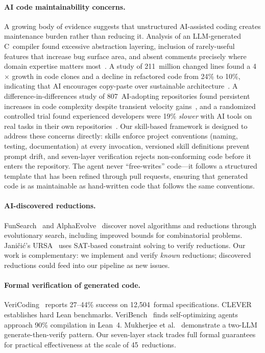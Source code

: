 \documentclass[conference]{IEEEtran}
\begin{document}
\paragraph{AI code maintainability concerns.}
A growing body of evidence suggests that unstructured AI-assisted coding creates maintenance burden rather than reducing it.
Analysis of an LLM-generated C~compiler found excessive abstraction layering, inclusion of rarely-useful features that increase bug surface area, and absent comments precisely where domain expertise matters most~\cite{Jones2026LLMCompiler}.
A study of 211~million changed lines found a 4$\times$ growth in code clones and a decline in refactored code from 24\% to 10\%, indicating that AI encourages copy-paste over sustainable architecture~\cite{GitClear2025CodeQuality}.
A difference-in-differences study of 807~AI-adopting repositories found persistent increases in code complexity despite transient velocity gains~\cite{CursorAI2025SpeedCost}, and a randomized controlled trial found experienced developers were 19\% \emph{slower} with AI tools on real tasks in their own repositories~\cite{Becker2025METRProductivity}.
Our skill-based framework is designed to address these concerns directly: skills enforce project conventions (naming, testing, documentation) at every invocation, versioned skill definitions prevent prompt drift, and seven-layer verification rejects non-conforming code before it enters the repository.
The agent never ``free-writes'' code---it follows a structured template that has been refined through pull requests, ensuring that generated code is as maintainable as hand-written code that follows the same conventions.

\paragraph{AI-discovered reductions.}
FunSearch~\cite{RomeraParedes2023FunSearch} and AlphaEvolve~\cite{Novikov2025AlphaEvolve} discover novel algorithms and reductions through evolutionary search, including improved bounds for combinatorial problems.
Jani\v{c}i\'{c}'s URSA~\cite{Janicic2025URSA} uses SAT-based constraint solving to verify reductions.
Our work is complementary: we implement and verify \emph{known} reductions; discovered reductions could feed into our pipeline as new issues.

\paragraph{Formal verification of generated code.}
VeriCoding~\cite{Bursuc2025VeriCoding} reports 27--44\% success on 12,504~formal specifications.
CLEVER~\cite{Thakur2025CLEVER} establishes hard Lean benchmarks.
VeriBench~\cite{Miranda2025VeriBench} finds self-optimizing agents approach 90\% compilation in Lean~4.
Mukherjee et al.~\cite{Mukherjee2025CoqPL, Mukherjee2025SynVer} demonstrate a two-LLM generate-then-verify pattern.
Our seven-layer stack trades full formal guarantees for practical effectiveness at the scale of 45~reductions.
\end{document}
